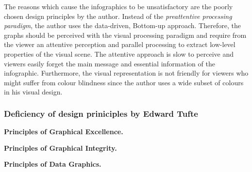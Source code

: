 \documentclass[a4paper, 11pt]{scrartcl}
\begin{document}
The reasons which cause the infographics to be unsatisfactory are the poorly
chosen design principles by the author. Instead of the \textit{preattentive
processing paradigm}, the author uses the data-driven, Bottom-up approach.
Therefore, the graphs should be perceived with the visual processing paradigm
and require from the viewer an attentive perception and parallel processing to
extract low-level properties of the visual scene. The attentive approach is slow
to perceive and viewers easily forget the main message and essential information
of the infographic. Furthermore, the visual representation is not friendly for
viewers who might suffer from colour blindness since the author uses a wide
subset of colours in his visual design.

\subsubsection{Deficiency of design priniciples by Edward Tufte}

\textbf{Principles of Graphical Excellence.} 


\textbf{Principles of Graphical Integrity.}


\textbf{Principles of Data Graphics.}

\end{document}
